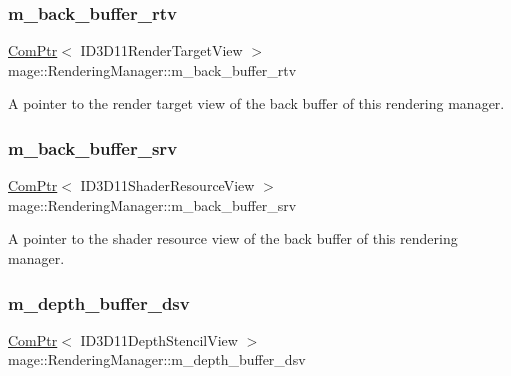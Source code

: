 \subsubsection{\texorpdfstring{m\+\_\+back\+\_\+buffer\+\_\+rtv}{m\_back\_buffer\_rtv}}
{\footnotesize\ttfamily \hyperlink{namespacemage_ae74f374780900893caa5555d1031fd79}{Com\+Ptr}$<$ I\+D3\+D11\+Render\+Target\+View $>$ mage\+::\+Rendering\+Manager\+::m\+\_\+back\+\_\+buffer\+\_\+rtv\hspace{0.3cm}{\ttfamily [private]}}

A pointer to the render target view of the back buffer of this rendering manager. \hypertarget{classmage_1_1_rendering_manager_a62c2532714246bfea0e8c4186fbfbc7d}{}\label{classmage_1_1_rendering_manager_a62c2532714246bfea0e8c4186fbfbc7d} 
\subsubsection{\texorpdfstring{m\+\_\+back\+\_\+buffer\+\_\+srv}{m\_back\_buffer\_srv}}
{\footnotesize\ttfamily \hyperlink{namespacemage_ae74f374780900893caa5555d1031fd79}{Com\+Ptr}$<$ I\+D3\+D11\+Shader\+Resource\+View $>$ mage\+::\+Rendering\+Manager\+::m\+\_\+back\+\_\+buffer\+\_\+srv\hspace{0.3cm}{\ttfamily [private]}}

A pointer to the shader resource view of the back buffer of this rendering manager. \hypertarget{classmage_1_1_rendering_manager_a8a630979d8f3075d8d6f27732cf7759d}{}\label{classmage_1_1_rendering_manager_a8a630979d8f3075d8d6f27732cf7759d} 
\subsubsection{\texorpdfstring{m\+\_\+depth\+\_\+buffer\+\_\+dsv}{m\_depth\_buffer\_dsv}}
{\footnotesize\ttfamily \hyperlink{namespacemage_ae74f374780900893caa5555d1031fd79}{Com\+Ptr}$<$ I\+D3\+D11\+Depth\+Stencil\+View $>$ mage\+::\+Rendering\+Manager\+::m\+\_\+depth\+\_\+buffer\+\_\+dsv\hspace{0.3cm}{\ttfamily [private]}}

